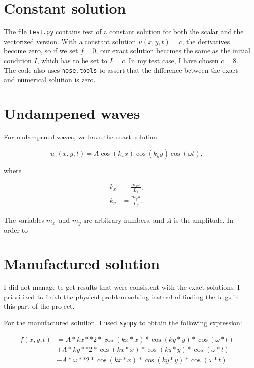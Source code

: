 \documentclass[10pt, a4paper]{amsart}
\numberwithin{figure}{section}
\numberwithin{table}{section}
\begin{document}
\section{Constant solution}

The file \texttt{test.py} contains test of a constant solution for both the
scalar and the vectorized version. With a constant solution $u(x,y,t) = c$, the derivatives
become zero, so if we set $f = 0$, our exact solution becomes the same as the
initial condition $I$, which has to be set to $I=c$. In my test case, I have
chosen $c=8$. The code also uses \texttt{nose.tools} to assert that the
difference between the exact and numerical solution is zero.


\section{Undampened waves}

For undampened waves, we have the exact solution

\begin{equation}
    u_e(x, y, t) = A \cos(k_x x) \cos (k_y y) \cos (\omega t),
\end{equation}

where

\begin{align}
    k_x &= \frac{m_x \pi}{L_x},\\
    k_y &= \frac{m_y \pi}{L_y}.
\end{align}

The variables $m_x$ and $m_y$ are arbitrary numbers, and $A$ is the
amplitude. In order to

\section{Manufactured solution}

I did not manage to get results that were consistent with the exact solutions.
I prioritized to finish the physical problem solving instead of finding the
bugs in this part of the project.

For the manufactured solution, I used \texttt{sympy} to obtain the following
expression:

\begin{align}
    f(x, y, t) &= A*kx**2*\cos(kx*x)*\cos(ky*y)*\cos(\omega*t)\\
    & + A*ky**2*\cos(kx*x)*\cos(ky*y)*\cos(\omega*t) \\
    &-A*\omega**2*\cos(kx*x)*\cos(ky*y)*\cos(\omega*t)
\end{align}
\end{document}
